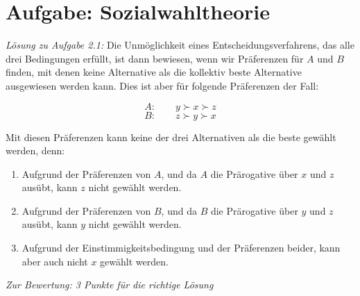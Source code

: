 \documentclass[10pt, a4paper, german]{article}
\numberwithin {equation}{section}
\begin{document}
\section{Aufgabe: Sozialwahltheorie}

{\em Lösung zu Aufgabe 2.1:} Die Unmöglichkeit eines Entscheidungsverfahrens,
das alle drei Bedingungen erfüllt, ist dann bewiesen, wenn wir Präferenzen für $A$ und $B$ finden, mit
denen keine Alternative als die kollektiv beste Alternative ausgewiesen werden
kann. Dies ist aber für folgende Präferenzen der
Fall:

\[A:\qquad y \succ x \succ z \]
\[B:\qquad z \succ y \succ x \]

Mit diesen Präferenzen kann keine der drei Alternativen als die beste
gewählt werden, denn:
\begin{enumerate}
  \item Aufgrund der Präferenzen von $A$, und da $A$ die
  Prärogative über $x$ und $z$ ausübt, kann $z$ nicht gewählt werden.
  \item Aufgrund der Präferenzen von $B$, und da $B$ die Prärogative
  über $y$ und $z$ ausübt, kann $y$ nicht gewählt werden.
  \item Aufgrund der Einstimmigkeitsbedingung und der Präferenzen beider, kann
  aber auch nicht $x$ gewählt werden.
\end{enumerate}

\vspace{0.25cm}

{\em Zur Bewertung: 3 Punkte für die richtige Lösung}

\vspace{0.5cm}
\end{document}
